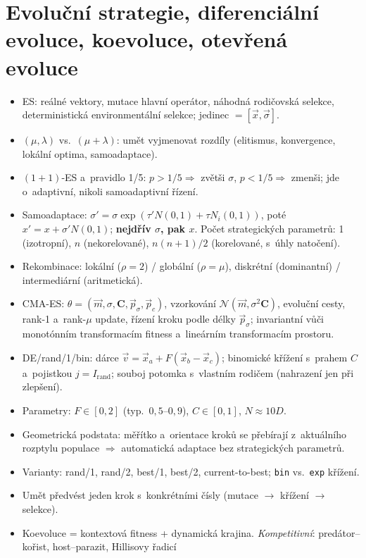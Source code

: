 \documentclass[11pt,a4paper]{article}
\theoremstyle{definition}
\begin{document}
\section{Evoluční strategie, diferenciální evoluce, koevoluce, otevřená evoluce}
\begin{itemize}
\item ES: reálné vektory, mutace hlavní operátor, náhodná rodičovská selekce,
 deterministická environmentální selekce; jedinec $= [\vec x, \vec\sigma]$.
\item $(\mu,\lambda)$ vs.\ $(\mu+\lambda)$: umět vyjmenovat rozdíly
 (elitismus, konvergence, lokální optima, samoadaptace).
\item $(1+1)$-ES a~pravidlo 1/5: $p > 1/5 \Rightarrow$ zvětši $\sigma$,
 $p < 1/5 \Rightarrow$ zmenši; jde o~adaptivní, nikoli samoadaptivní řízení.
\item Samoadaptace: $\sigma' = \sigma \exp(\tau'N(0,1) + \tau N_i(0,1))$,
 poté $x' = x + \sigma' N(0,1)$; \textbf{nejdřív $\sigma$, pak $x$}.
 Počet strategických parametrů: 1 (izotropní), $n$ (nekorelované),
 $n(n+1)/2$ (korelované, s~úhly natočení).
\item Rekombinace: lokální ($\rho=2$) / globální ($\rho=\mu$),
 diskrétní (dominantní) / intermediární (aritmetická).
\item CMA-ES: $\theta = (\vec m,\sigma,\mathbf C,\vec p_\sigma,\vec p_c)$,
 vzorkování $\mathcal N(\vec m, \sigma^2\mathbf C)$, evoluční cesty,
 rank-1 a~rank-$\mu$ update, řízení kroku podle délky $\vec p_\sigma$;
 invariantní vůči monotónním transformacím fitness a~lineárním transformacím
 prostoru.
\item DE/rand/1/bin: dárce $\vec v = \vec x_a + F(\vec x_b - \vec x_c)$;
 binomické křížení s~prahem $C$ a~pojistkou $j = I_{\mathrm{rand}}$;
 souboj potomka s~vlastním rodičem (nahrazení jen při zlepšení).
\item Parametry: $F \in [0,2]$ (typ.\ $0{,}5$--$0{,}9$), $C \in [0,1]$,
 $N \approx 10D$.
\item Geometrická podstata: měřítko a~orientace kroků se přebírají z~aktuálního
 rozptylu populace $\Rightarrow$ automatická adaptace bez strategických
 parametrů.
\item Varianty: rand/1, rand/2, best/1, best/2, current-to-best;
 \texttt{bin} vs.\ \texttt{exp} křížení.
\item Umět předvést jeden krok s~konkrétními čísly (mutace $\to$ křížení
 $\to$ selekce).
\item Koevoluce = kontextová fitness + dynamická krajina.
 \emph{Kompetitivní}: predátor--kořist, host--parazit, Hillisovy řadicí

\end{itemize}
\end{document}
